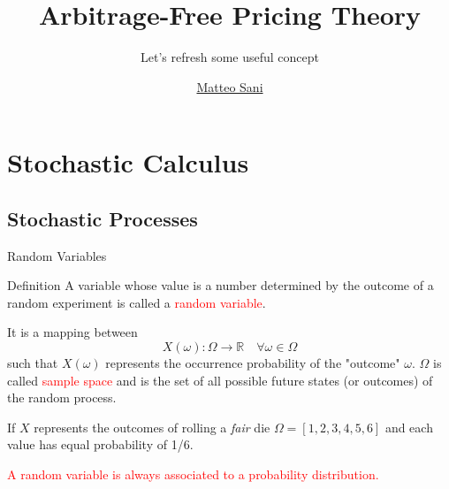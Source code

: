 \documentclass{beamer}
\title{Arbitrage-Free Pricing Theory}
\subtitle{Let's refresh some useful concept}
\author{\href{mailto:matteo.sani@unisi.it}{Matteo Sani}}
\begin{document}
	\begin{frame}[plain]
		\maketitle
	\end{frame}        



\section{Stochastic Calculus}
\subsection{Stochastic Processes}
\begin{frame}{Random Variables}
	\begin{block}{Definition}
	A variable whose value is a number determined by the outcome of a random experiment is called a \textcolor{red}{random variable}.
	
	It is a mapping between 
	\begin{equation*}
		X(\omega):\Omega\rightarrow \mathbb{R}\quad \forall\omega\in\Omega
	\end{equation*}
	such that $X(\omega)$ represents the occurrence probability of the "outcome" $\omega$. $\Omega$ is called \textcolor{red}{sample space} and is the set of all possible future states (or outcomes) of the random process.
	\end{block}
        
	If $X$ represents the outcomes of rolling a \emph{fair} die $\Omega = [1,2,3,4,5,6]$ and each value has equal probability of 1/6.
	\vspace{0.5cm}
        
	\textcolor{red}{A random variable is always associated to a probability distribution.}
\end{frame}
\end{document}
